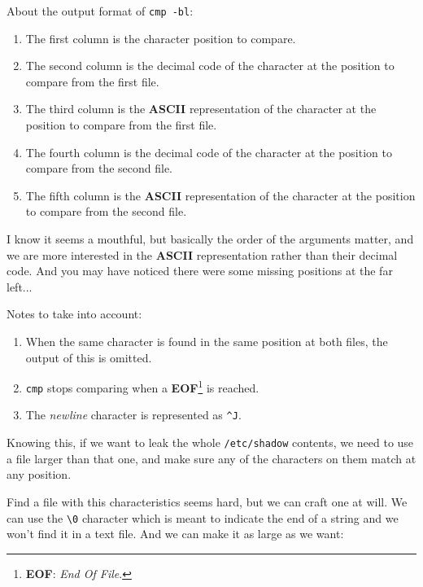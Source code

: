 \documentclass[12pt]{article}
\begin{document}
    About the output format of \verb!cmp -bl!:
    \begin{enumerate}
        \item The first column is the character position to compare.
        \item The second column is the decimal code of the character at the 
            position to compare from the first file.
        \item The third column is the \textbf{ASCII} representation of
            the character at the position to compare from the first file.
        \item The fourth column is the decimal code of the character at the 
            position to compare from the second file.
        \item The fifth column is the \textbf{ASCII} representation of
            the character at the position to compare from the second file.
    \end{enumerate}
    
    I know it seems a mouthful, but basically the order of the arguments matter,
    and we are more interested in the \textbf{ASCII} representation rather than
    their decimal code. And you may have noticed there were some missing
    positions at the far left...

    Notes to take into account:
    \begin{enumerate}
        \item When the same character is found in the same position at both
            files, the output of this is omitted.
        \item \verb!cmp! stops comparing when a
            \textbf{EOF}\footnote{\textbf{EOF}: \textit{End Of File}.} is
            reached.
        \item The \textit{newline} character is represented as \verb!^J!.
    \end{enumerate}

    Knowing this, if we want to leak the whole \texttt{/etc/shadow} contents, we
    need to use a file larger than that one, and make sure any of the characters
    on them match at any position.

    Find a file with this characteristics seems hard, but we can craft one at
    will. We can use the \verb!\0! character which is meant to indicate the end
    of a string and we won't find it in a text file. And we can make it as large
    as we want:
\end{document}
